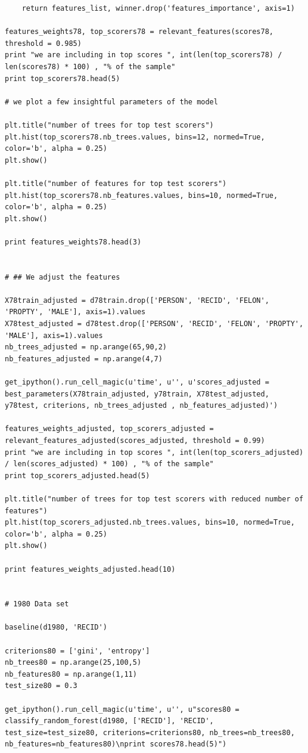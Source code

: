\documentclass[a4paper]{article}
\theoremstyle{plain}
\begin{document}
\begin{lstlisting}
    return features_list, winner.drop('features_importance', axis=1)

features_weights78, top_scorers78 = relevant_features(scores78, threshold = 0.985)
print "we are including in top scores ", int(len(top_scorers78) / len(scores78) * 100) , "% of the sample"
print top_scorers78.head(5)

# we plot a few insightful parameters of the model

plt.title("number of trees for top test scorers")
plt.hist(top_scorers78.nb_trees.values, bins=12, normed=True, color='b', alpha = 0.25)
plt.show()

plt.title("number of features for top test scorers")
plt.hist(top_scorers78.nb_features.values, bins=10, normed=True, color='b', alpha = 0.25)
plt.show()

print features_weights78.head(3)


# ## We adjust the features

X78train_adjusted = d78train.drop(['PERSON', 'RECID', 'FELON', 'PROPTY', 'MALE'], axis=1).values
X78test_adjusted = d78test.drop(['PERSON', 'RECID', 'FELON', 'PROPTY', 'MALE'], axis=1).values
nb_trees_adjusted = np.arange(65,90,2)
nb_features_adjusted = np.arange(4,7)

get_ipython().run_cell_magic(u'time', u'', u'scores_adjusted =  best_parameters(X78train_adjusted, y78train, X78test_adjusted, y78test, criterions, nb_trees_adjusted , nb_features_adjusted)')

features_weights_adjusted, top_scorers_adjusted = relevant_features_adjusted(scores_adjusted, threshold = 0.99)
print "we are including in top scores ", int(len(top_scorers_adjusted) / len(scores_adjusted) * 100) , "% of the sample"
print top_scorers_adjusted.head(5)

plt.title("number of trees for top test scorers with reduced number of features")
plt.hist(top_scorers_adjusted.nb_trees.values, bins=10, normed=True, color='b', alpha = 0.25)
plt.show()

print features_weights_adjusted.head(10)


# 1980 Data set

baseline(d1980, 'RECID')

criterions80 = ['gini', 'entropy']
nb_trees80 = np.arange(25,100,5)
nb_features80 = np.arange(1,11)
test_size80 = 0.3

get_ipython().run_cell_magic(u'time', u'', u"scores80 =  classify_random_forest(d1980, ['RECID'], 'RECID', test_size=test_size80, criterions=criterions80, nb_trees=nb_trees80, nb_features=nb_features80)\nprint scores78.head(5)")


\end{lstlisting}
\end{document}
